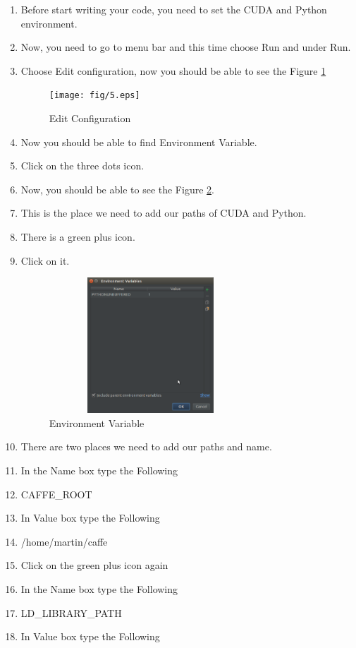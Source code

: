 \documentclass[12pt]{article}
\begin{document}
\begin{enumerate}
  \item Before start writing your code, you need to set the CUDA and Python environment.
  \item Now, you need to go to menu bar and this time choose Run and under Run.
  \item Choose Edit configuration, now you should be able to see the Figure \ref{fig:5}
\begin{figure}[h]
	\centerline{\texttt{[image: fig/5.eps]}}
	\caption{Edit Configuration}
	\label{fig:5}
\end{figure}
  \item Now you should be able to find Environment Variable.
  \item Click on the three dots icon.
  \item Now, you should be able to see the Figure \ref{fig:6}.
  \item This is the place we need to add our paths of CUDA and Python.
  \item There is a green plus icon.
  \item Click on it.
\begin{figure}[ht]
	\centerline{\includegraphics[width=3in, height=2in]{fig/6.eps}}
	\caption{Environment Variable}
	\label{fig:6}
\end{figure}
  \item There are two places we need to add our paths and name.
  \item In the Name box type the Following
  \item CAFFE\_ROOT
  \item In Value box type the Following
  \item /home/martin/caffe
  \item Click on the green plus icon again
  \item In the Name box type the Following
  \item LD\_LIBRARY\_PATH
  \item In Value box type the Following

\end{enumerate}
\end{document}
